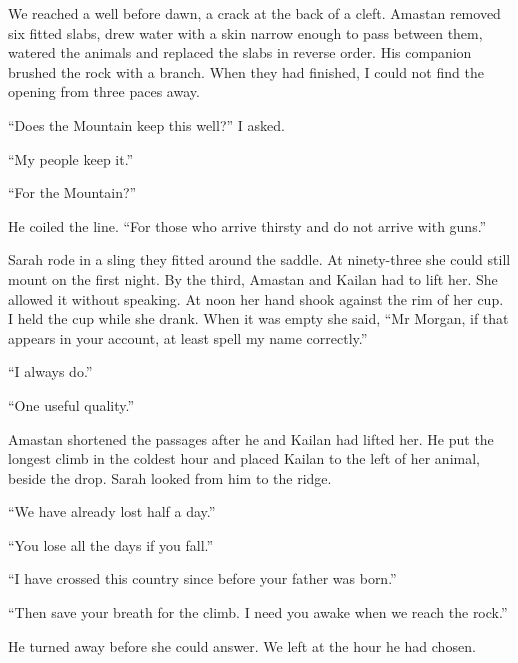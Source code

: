 We reached a well before dawn, a crack at the back of a cleft. Amastan removed six fitted slabs, drew water with a skin narrow enough to pass between them, watered the animals and replaced the slabs in reverse order. His companion brushed the rock with a branch. When they had finished, I could not find the opening from three paces away.\par

``Does the Mountain keep this well?'' I asked.\par

``My people keep it.''\par

``For the Mountain?''\par

He coiled the line. ``For those who arrive thirsty and do not arrive with guns.''\par

Sarah rode in a sling they fitted around the saddle. At ninety-three she could still mount on the first night. By the third, Amastan and Kailan had to lift her. She allowed it without speaking. At noon her hand shook against the rim of her cup. I held the cup while she drank. When it was empty she said, ``Mr Morgan, if that appears in your account, at least spell my name correctly.''\par

``I always do.''\par

``One useful quality.''\par

Amastan shortened the passages after he and Kailan had lifted her. He put the longest climb in the coldest hour and placed Kailan to the left of her animal, beside the drop. Sarah looked from him to the ridge.\par

``We have already lost half a day.''\par

``You lose all the days if you fall.''\par

``I have crossed this country since before your father was born.''\par

``Then save your breath for the climb. I need you awake when we reach the rock.''\par

He turned away before she could answer. We left at the hour he had chosen.\par

